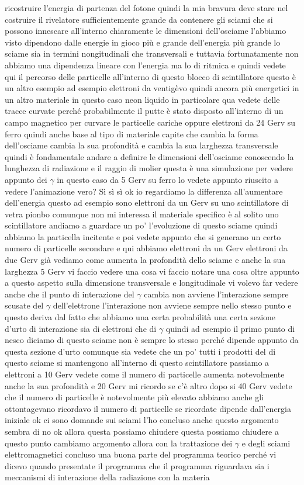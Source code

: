 {ricostruire l'energia di partenza del fotone quindi la mia bravura deve stare nel costruire il rivelatore sufficientemente grande da contenere gli sciami che si possono innescare all'interno chiaramente le dimensioni dell'osciame l'abbiamo visto dipendono dalle energie in gioco più e grande dell'energia più grande lo sciame sia in termini nongitudinali che transversali e tuttavia fortunatamente non abbiamo una dipendenza lineare con l'energia ma lo di ritmica e quindi vedete qui il percorso delle particelle all'interno di questo blocco di scintillatore questo è un altro esempio ad esempio elettroni da ventigèvo quindi ancora più energetici in un altro materiale in questo caso neon liquido in particolare qua vedete delle tracce curvate perché probabilmente il putte è stato disposto all'interno di un campo magnetico per curvare le particelle cariche oppure elettroni da 24 Gerv su ferro quindi anche base al tipo di materiale capite che cambia la forma dell'osciame cambia la sua profondità e cambia la sua larghezza transversale quindi è fondamentale andare a definire le dimensioni dell'osciame conoscendo la lunghezza di radiazione e il raggio di molier questa è una simulazione per vedere appunto dei $\gamma$ in questo caso da 5 Gerv su ferro lo vedete appunto riuscito a vedere l'animazione vero? Sì sì sì ok io regardiamo la differenza all'aumentare dell'energia questo ad esempio sono elettroni da un Gerv su uno scintillatore di vetra pionbo comunque non mi interessa il materiale specifico è al solito uno scintillatore andiamo a guardare un po' l'evoluzione di questo sciame quindi abbiamo la particella incitente e poi vedete appunto che si generano un certo numero di particelle secondare e qui abbiamo elettroni da un Gerv elettroni da due Gerv già vediamo come aumenta la profondità dello sciame e anche la sua larghezza 5 Gerv vi faccio vedere una cosa vi faccio notare una cosa oltre appunto a questo aspetto sulla dimensione transversale e longitudinale vi volevo far vedere anche che il punto di interazione del $\gamma$ cambia non avviene l'interazione sempre scusate del $\gamma$ dell'elettrone l'interazione non avviene sempre nello stesso punto e questo deriva dal fatto che abbiamo una certa probabilità una certa sezione d'urto di interazione sia di elettroni che di $\gamma$ quindi ad esempio il primo punto di nesco diciamo di questo sciame non è sempre lo stesso perché dipende appunto da questa sezione d'urto comunque sia vedete che un po' tutti i prodotti del di questo sciame si mantengono all'interno di questo scintillatore passiamo a elettroni a 10 Gerv vedete come il numero di particelle aumenta notevolmente anche la sua profondità e 20 Gerv mi ricordo se c'è altro dopo si 40 Gerv vedete che il numero di particelle è notevolmente più elevato abbiamo anche gli ottontagevano ricordavo il numero di particelle se ricordate dipende dall'energia iniziale ok ci sono domande sui sciami l'ho concluso anche questo argomento sembra di no ok allora questa possiamo chiudere questa possiamo chiudere a questo punto cambiamo argomento allora con la trattazione dei $\gamma$ e degli sciami elettromagnetici concluso una buona parte del programma teorico perché vi dicevo quando presentate il programma che il programma riguardava sia i meccanismi di interazione della radiazione con la materia

}